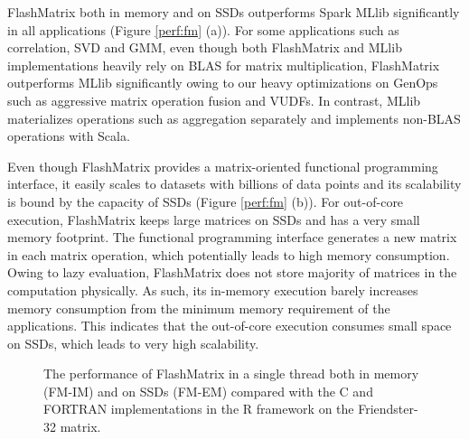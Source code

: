 FlashMatrix both in memory and on SSDs outperforms Spark MLlib significantly
in all applications (Figure \ref{perf:fm} (a)). For some applications
such as correlation, SVD and GMM, even though both FlashMatrix and MLlib
implementations heavily rely on BLAS for matrix multiplication, FlashMatrix
outperforms MLlib significantly owing to our heavy optimizations on GenOps
such as aggressive matrix operation fusion and VUDFs. In contrast, MLlib
materializes operations such as aggregation separately and implements
non-BLAS operations with Scala.

%		

Even though FlashMatrix provides a matrix-oriented functional programming
interface, it easily scales to datasets with billions of data points and its
scalability is bound by the capacity of SSDs (Figure \ref{perf:fm} (b)).
For out-of-core execution, FlashMatrix keeps large matrices on
SSDs and has a very small memory footprint. The functional programming
interface generates a new matrix in each matrix operation, which potentially
leads to high memory consumption. Owing to lazy evaluation,
FlashMatrix does not store majority of matrices in the computation physically.
As such, its in-memory execution barely increases memory consumption from
the minimum memory requirement of the applications. This indicates that
the out-of-core execution consumes small space on SSDs, which leads to
very high scalability.

\begin{figure}
	\begin{center}
		\footnotesize
		\vspace{-15pt}
		
		\vspace{-10pt}
		\caption{The performance of FlashMatrix in a single thread both in
			memory (FM-IM) and on SSDs (FM-EM) compared with the C and FORTRAN
		implementations in the R framework on the Friendster-32 matrix.}
		\label{fig:fmR}
	\end{center}
\end{figure}

